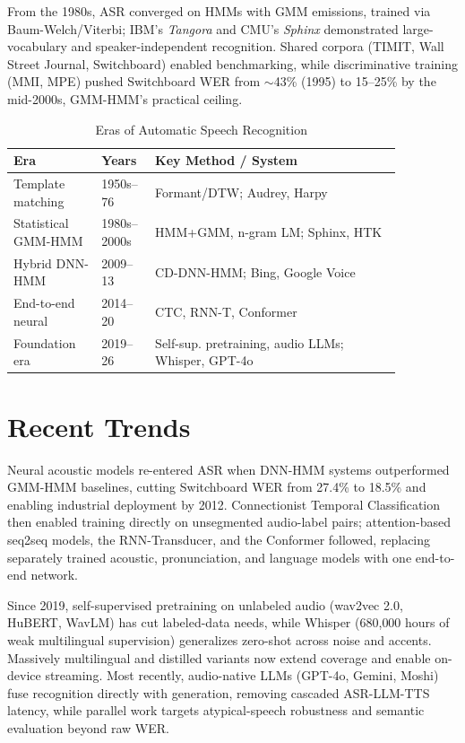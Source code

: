 \documentclass[conference]{IEEEtran}
\begin{document}
From the 1980s, ASR converged on HMMs with GMM emissions, trained via Baum-Welch/Viterbi; IBM's \emph{Tangora} and CMU's \emph{Sphinx} demonstrated large-vocabulary and speaker-independent recognition. Shared corpora (TIMIT, Wall Street Journal, Switchboard) enabled benchmarking, while discriminative training (MMI, MPE) pushed Switchboard WER from $\sim$43\% (1995) to 15--25\% by the mid-2000s, GMM-HMM's practical ceiling.

\begin{table}[t]
\caption{Eras of Automatic Speech Recognition}
\label{tab1}
\centering
\footnotesize
\begin{tabular}{|p{0.20\linewidth}|p{0.09\linewidth}|p{0.57\linewidth}|}
\hline
\textbf{Era} & \textbf{Years} & \textbf{Key Method / System} \\
\hline
Template matching & 1950s--76 & Formant/DTW; Audrey, Harpy \\
Statistical GMM-HMM & 1980s--2000s & HMM+GMM, n-gram LM; Sphinx, HTK \\
Hybrid DNN-HMM & 2009--13 & CD-DNN-HMM; Bing, Google Voice \\
End-to-end neural & 2014--20 & CTC, RNN-T, Conformer \\
Foundation era & 2019--26 & Self-sup. pretraining, audio LLMs; Whisper, GPT-4o \\
\hline
\end{tabular}
\end{table}

\section{Recent Trends}
Neural acoustic models re-entered ASR when DNN-HMM systems outperformed GMM-HMM baselines, cutting Switchboard WER from 27.4\% to 18.5\% and enabling industrial deployment by 2012. Connectionist Temporal Classification then enabled training directly on unsegmented audio-label pairs; attention-based seq2seq models, the RNN-Transducer, and the Conformer followed, replacing separately trained acoustic, pronunciation, and language models with one end-to-end network.

Since 2019, self-supervised pretraining on unlabeled audio (wav2vec 2.0, HuBERT, WavLM) has cut labeled-data needs, while Whisper \cite{b12} (680{,}000 hours of weak multilingual supervision) generalizes zero-shot across noise and accents. Massively multilingual and distilled variants now extend coverage and enable on-device streaming. Most recently, audio-native LLMs (GPT-4o, Gemini, Moshi) fuse recognition directly with generation, removing cascaded ASR-LLM-TTS latency, while parallel work targets atypical-speech robustness and semantic evaluation beyond raw WER.
\end{document}
